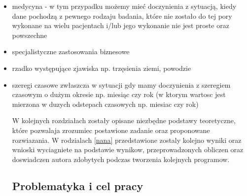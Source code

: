 \begin{itemize}
\item medycyna - w tym przypadku możemy mieć doczynienia z sytuacją, kiedy dane pochodzą z pewnego rodzaju badania, które nie zostało do tej pory wykonane na wielu pacjentach i/lub jego wykonanie nie jest proste oraz powszechne
\item specjalistyczne zastosowania biznesowe
\item rzadko występujące zjawiska np. trzęsienia ziemi, powodzie
\item szeregi czasowe  zwłaszcza w sytuacji gdy mamy doczynienia z szeregiem czasowym o dużym okresie np. miesiąc czy rok (w ktorym wartosc jest mierzona w duzych odstepach czasowych np. miesiac czy rok)


W kolejnych rozdziałach zostały opisane niezbędne podstawy teoretyczne, które pozwalaja zrozumiec postawione zadanie oraz proponowane rozwiazania. W rodzialach \ref{nana} przedstawione zostaly kolejno wyniki oraz wnioski wyciagniete 
na podstawie wynikow, przeprowadzonych obliczen oraz doswiadczen autora zdobytych podczas tworzenia kolejnych programow.


\subsection{Problematyka i cel pracy}

\end{itemize}